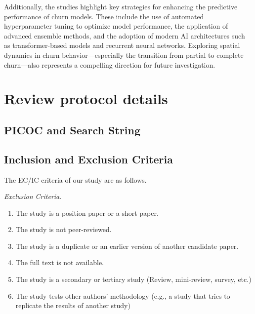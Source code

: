 \documentclass[preprint,12pt]{elsarticle}
\begin{document}
Additionally, the studies highlight key strategies for enhancing the predictive performance of churn models. These include the use of automated hyperparameter tuning to optimize model performance, the application of advanced ensemble methods, and the adoption of modern AI architectures such as transformer-based models and recurrent neural networks. Exploring spatial dynamics in churn behavior---especially the transition from partial to complete churn---also represents a compelling direction for future investigation.


 



\newpage
\appendix
\section{Review protocol details}
\label{Appendix}


\subsection{PICOC and Search String}
\label{subsec:Appendix-PICOC-and-Search-String}




\subsection{Inclusion and Exclusion Criteria}
\label{subsec:Appendix-IC-EC}
The EC/IC criteria of our study are as follows.

\textit{Exclusion Criteria}.
\begin{enumerate}[label=(EC\arabic*), leftmargin=19.5mm, itemsep=1pt, parsep=0pt]
    \item The study is a position paper or a short paper.
    \item The study is not peer-reviewed.
    \item The study is a duplicate or an earlier version of another candidate paper.
    \item The full text is not available.
    \item The study is a secondary or tertiary study (Review, mini-review, survey, etc.) 
    \item The study tests other authors' methodology (e.g., a study that tries to replicate the results of another study)
\end{enumerate}
\end{document}
